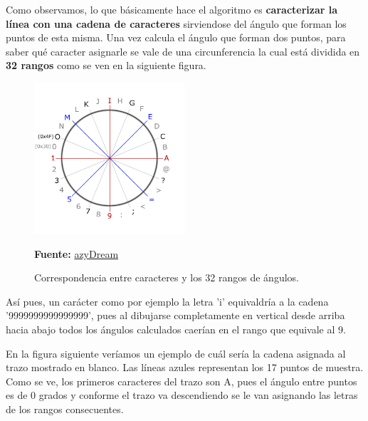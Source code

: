 \vspace{0.5cm}

Como observamos, lo que básicamente hace el algoritmo es \textbf{caracterizar la línea con una cadena de caracteres} sirviendose del ángulo que forman los puntos de esta misma. Una vez calcula el ángulo que forman dos puntos, para saber qué caracter asignarle se vale de una circunferencia la cual está dividida en \textbf{32 rangos} como se ven en la siguiente figura.

\vspace{0.5cm}

\begin{figure}[htbp]
\centering
  \includegraphics[width=0.5\textwidth]{archivos/recocircle.png}
  \caption{Correspondencia entre caracteres y los 32 rangos de ángulos.}
  \textbf{Fuente:} \href{https://azydream.tistory.com/55}{azyDream}
  \label{fig:recocircle}
\end{figure}

\vspace{0.5cm}

Así pues, un carácter como por ejemplo la letra 'i' equivaldría a la cadena '9999999999999999', pues al dibujarse completamente en vertical desde arriba hacia abajo todos los ángulos calculados caerían en el rango que equivale al 9.

\vspace{0.5cm}

En la figura siguiente veríamos un ejemplo de cuál sería la cadena asignada al trazo mostrado en blanco. Las líneas azules representan los 17 puntos de muestra. Como se ve, los primeros caracteres del trazo son A, pues el ángulo entre puntos es de 0 grados y conforme el trazo va descendiendo se le van asignando las letras de los rangos consecuentes.

\vspace{0.5cm}

